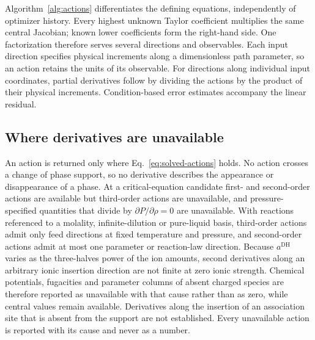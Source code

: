 Algorithm~\ref{alg:actions} differentiates the defining equations, independently of optimizer history.
Every highest unknown Taylor coefficient multiplies the same central Jacobian; known lower coefficients form the right-hand side.
One factorization therefore serves several directions and observables.
Each input direction specifies physical increments along a dimensionless path parameter, so an action retains the units of its observable.
For directions along individual input coordinates, partial derivatives follow by dividing the actions by the product of their physical increments.
Condition-based error estimates accompany the linear residual.


\subsection{Where derivatives are unavailable}
\label{sec:availability}
An action is returned only where Eq.~\eqref{eq:solved-actions} holds.
No action crosses a change of phase support, so no derivative describes the appearance or disappearance of a phase.
At a critical-equation candidate first- and second-order actions are available but third-order actions are unavailable, and pressure-specified quantities that divide by $\partial P/\partial\rho=0$ are unavailable.
With reactions referenced to a molality, infinite-dilution or pure-liquid basis, third-order actions admit only feed directions at fixed temperature and pressure, and second-order actions admit at most one parameter or reaction-law direction.
Because $a^{\mathrm{DH}}$ varies as the three-halves power of the ion amounts, second derivatives along an arbitrary ionic insertion direction are not finite at zero ionic strength.
Chemical potentials, fugacities and parameter columns of absent charged species are therefore reported as unavailable with that cause rather than as zero, while central values remain available.
Derivatives along the insertion of an association site that is absent from the support are not established.
Every unavailable action is reported with its cause and never as a number.


